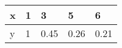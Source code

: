\documentclass{article}
\begin{document}
\begin{table}[h!]
\begin{tabular}{l|l|l|l|l}

\multicolumn{1}{p{30.865313pt}}{\raggedright x} & \multicolumn{1}{|p{30.865313pt}}{\raggedright 1} & \multicolumn{1}{|p{32.370937pt}}{\raggedright 3} & \multicolumn{1}{|p{30.1125pt}}{\raggedright 5} & \multicolumn{1}{|p{30.1125pt}}{\raggedright 6}\\ 
\hline 
\multicolumn{1}{p{30.865313pt}}{\raggedright y} & \multicolumn{1}{|p{30.865313pt}}{\raggedright 1} & \multicolumn{1}{|p{32.370937pt}}{\raggedright 0.45} & \multicolumn{1}{|p{30.1125pt}}{\raggedright 0.26} & \multicolumn{1}{|p{30.1125pt}}{\raggedright 0.21}\\ 


\end{tabular}
\end{table}
\end{document}
